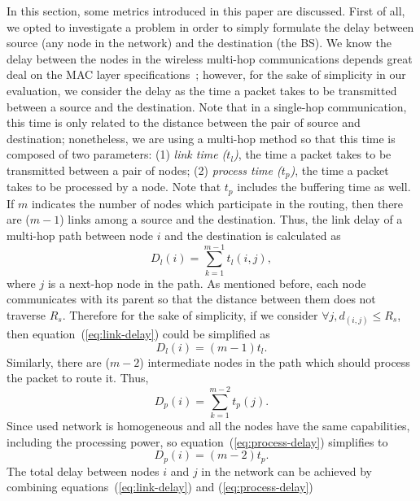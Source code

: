 \documentclass[journal]{IEEEtran}
\begin{document}
In this section, some metrics introduced in this paper are discussed.  First of all, we opted to investigate a problem in order to simply formulate the delay between source (any node in the network) and the destination (the BS).  We know the delay between the nodes in the wireless multi-hop communications depends great deal on the MAC layer specifications~\cite{hanzo-delay}; however,  for the sake of simplicity in our evaluation, we consider  the delay as the time a packet takes to be transmitted between a source and the destination. Note that in a single-hop communication, this time is only related to the distance between the pair of source and destination; nonetheless, we are using a multi-hop method so that this time is composed of two parameters: (1) {\it link time ($t_{l}$)}, the time a packet takes to be transmitted between a pair of nodes; (2) {\it process time ($t_{p}$)}, the time a packet takes to be  processed by a node.  Note that $t_p$ includes the buffering time as well.  If $m$ indicates the number of nodes which participate in the routing, then there are ($m-1$) links among a source and the destination.  Thus, the link delay of a multi-hop path between node $i$ and the destination is calculated as
\begin{equation}
\label{eq:link-delay}
D_{l}(i)=\sum_{k=1}^{m-1}t_{l}(i,j),
\end{equation}
where $j$ is a next-hop node in the path.  As mentioned before, each node communicates with its parent so that the distance between them does not traverse $R_{s}$.  Therefore for the sake of simplicity,  if we consider $\forall j, d_{(i,j)} \leq R_{s}$, then equation~(\ref{eq:link-delay}) could be simplified as
\begin{equation}
\label{eq:flink-delay}
D_{l}(i)=(m-1)t_{l}.
\end{equation}
Similarly, there are ($m-2$) intermediate nodes in the path which should process the packet to route it. Thus,
\begin{equation}
\label{eq:process-delay}
D_{p}(i)=\sum_{k=1}^{m-2}t_{p}(j).
\end{equation}
Since used network is homogeneous and all the nodes have the same capabilities, including the processing power, so equation~(\ref{eq:process-delay}) simplifies to
\begin{equation}
\label{eq:fprocess-delay}
D_{p}(i)=(m-2)t_{p}.
\end{equation}
The total delay between nodes $i$ and $j$ in the network can be achieved by combining equations~(\ref{eq:link-delay}) and (\ref{eq:process-delay})
\end{document}
